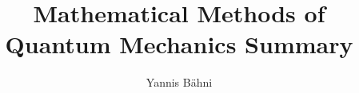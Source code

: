 

\setcounter{section}{1}

\title{Mathematical Methods of Quantum Mechanics Summary}
\author{Yannis B\"{a}hni}
\address[Yannis B\"{a}hni]{University of Zurich, R\"{a}mistrasse 71, 8006 Zurich}



\begin{abstract}

\end{abstract}

\maketitle

\tableofcontents





